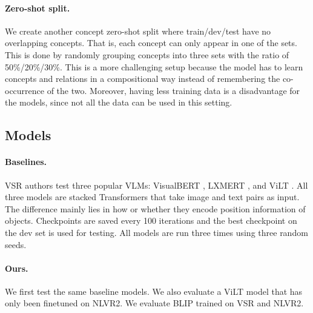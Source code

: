 \paragraph{Zero-shot split.}
We create another concept zero-shot split where train/dev/test have no overlapping concepts. That is, each concept can only appear in one of the sets.
This is done by randomly grouping concepts into three sets with the ratio of 50\%/20\%/30\%.
This is a more challenging setup because the model has to learn concepts and relations in a compositional way instead of remembering the co-occurrence of the two.
Moreover, having less training data is a disadvantage for the models, since not all the data can be used in this setting.

\subsection{Models}\label{sec:vsr_models}

\paragraph{Baselines.} VSR authors \cite{liu2022visual} test three popular VLMs: VisualBERT \cite{li2019visualbert}, 
LXMERT \cite{tan2020lxmert}, and
ViLT \cite{kim2021vilt}. All three models are stacked Transformers \cite{vaswani2017attention} that take image and text pairs as input. The difference mainly lies in how or whether they encode position information of objects. Checkpoints are saved every 100 iterations and the best checkpoint on the dev set is used for testing. All models are run three times using three random seeds.

\paragraph{Ours.} We first test the same baseline models. We also evaluate a ViLT model that has only been finetuned on NLVR2. We evaluate BLIP \cite{li2022blip} trained on VSR and NLVR2.

